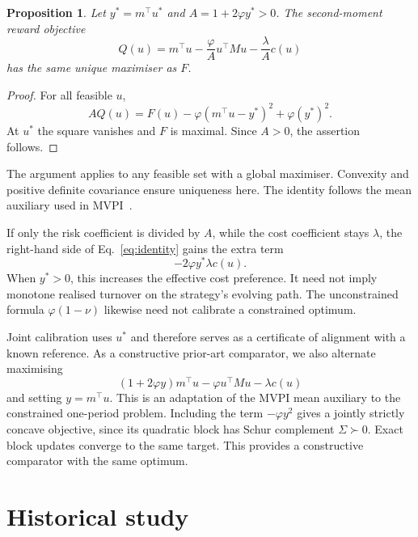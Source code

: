 \documentclass[sigconf,anonymous,review]{acmart}
\newtheorem{proposition}{Proposition}
\begin{document}
\begin{proposition}\label{prop:joint}
Let $y^*=m^\top u^*$ and $A=1+2\varphi y^*>0$. The second-moment reward objective
\begin{equation}
 Q(u)=m^\top u-\frac{\varphi}{A}u^\top M u-\frac{\lambda}{A}c(u)
\end{equation}
has the same unique maximiser as $F$.
\end{proposition}
\begin{proof}
For all feasible $u$,
\begin{equation}\label{eq:identity}
 AQ(u)=F(u)-\varphi(m^\top u-y^*)^2+\varphi(y^*)^2.
\end{equation}
At $u^*$ the square vanishes and $F$ is maximal. Since $A>0$, the assertion follows.
\end{proof}
The argument applies to any feasible set with a global maximiser. Convexity and positive definite covariance ensure uniqueness here. The identity follows the mean auxiliary used in MVPI\ \cite{zhang2021}.

If only the risk coefficient is divided by $A$, while the cost coefficient stays $\lambda$, the right-hand side of Eq.\ \eqref{eq:identity} gains the extra term
\begin{equation}\label{eq:costdistortion}
 -2\varphi y^*\lambda c(u).
\end{equation}
When $y^*>0$, this increases the effective cost preference. It need not imply monotone realised turnover on the strategy's evolving path. The unconstrained formula $\varphi(1-\nu)$ likewise need not calibrate a constrained optimum.

Joint calibration uses $u^*$ and therefore serves as a certificate of alignment with a known reference. As a constructive prior-art comparator, we also alternate maximising
\begin{equation}
 (1+2\varphi y)m^\top u-\varphi u^\top Mu-\lambda c(u)
\end{equation}
and setting $y=m^\top u$. This is an adaptation of the MVPI mean auxiliary to the constrained one-period problem. Including the term $-\varphi y^2$ gives a jointly strictly concave objective, since its quadratic block has Schur complement $\Sigma\succ0$. Exact block updates converge to the same target. This provides a constructive comparator with the same optimum.

\section{Historical study}
\end{document}
